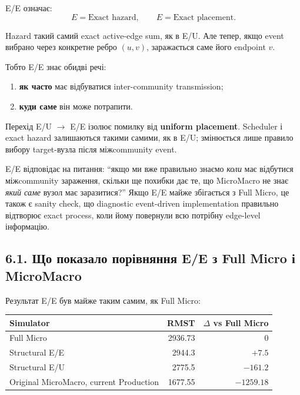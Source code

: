 \documentclass[11pt,a4paper]{article}
\begin{document}
E/E означає:
\[
 \boxed{E=\text{Exact hazard}},\qquad
 \boxed{E=\text{Exact placement}}.
\]

Hazard такий самий exact active-edge sum, як в E/U. Але тепер, якщо event вибрано через конкретне ребро $(u,v)$, заражається саме його endpoint $v$.

Тобто E/E знає обидві речі:
\begin{enumerate}[nosep]
\item \textbf{як часто} має відбуватися inter-community transmission;
\item \textbf{куди саме} він може потрапити.
\end{enumerate}

Перехід E/U $\to$ E/E ізолює помилку від \textbf{uniform placement}. Scheduler і exact hazard залишаються такими самими, як в E/U; змінюється лише правило вибору target-вузла після міжcommunity event.

\begin{tcolorbox}[colback=white,colframe=exact,title=Що саме перевіряє E/E?]
E/E відповідає на питання: ``якщо ми вже правильно знаємо \textit{коли} має відбутися міжcommunity зараження, скільки ще похибки дає те, що MicroMacro не знає \textit{який саме} вузол має заразитися?'' Якщо E/E майже збігається з Full Micro, це також є sanity check, що diagnostic event-driven implementation правильно відтворює exact process, коли йому повернули всю потрібну edge-level інформацію.
\end{tcolorbox}

\subsection*{6.1. Що показало порівняння E/E з Full Micro і MicroMacro}

Результат E/E був майже таким самим, як Full Micro:

\begin{center}
\begin{tabular}{l r r}
\toprule
\textbf{Simulator} & \textbf{RMST} & \textbf{$\Delta$ vs Full Micro}\\
\midrule
Full Micro & 2936.73 & 0\\
Structural E/E & 2944.3 & $+7.5$\\
Structural E/U & 2775.5 & $-161.2$\\
Original MicroMacro, current Production & 1677.55 & $-1259.18$\\
\bottomrule
\end{tabular}
\end{center}
\end{document}
